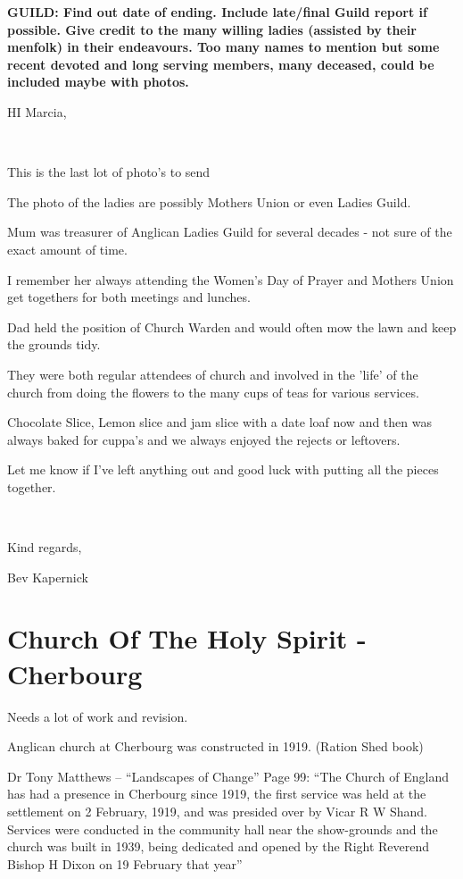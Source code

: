 \textbf{GUILD: Find out date of ending. Include late/final Guild report if possible. Give credit to the many willing ladies (assisted by their menfolk) in their endeavours. Too many names to mention but some recent devoted and long serving members, many deceased, could be included maybe with photos.}

HI Marcia,

~

This is the last lot of photo's to send

The photo of the ladies are possibly Mothers Union or even Ladies Guild.

Mum was treasurer of Anglican Ladies Guild for several decades - not sure of the exact amount of time.

I remember her always attending the Women's Day of Prayer and Mothers Union get togethers for both meetings and lunches.

Dad held the position of Church Warden and would often mow the lawn and keep the grounds tidy.

They were both regular attendees of church and involved in the 'life' of the church from doing the flowers to the many cups of teas for various services.

Chocolate Slice, Lemon slice and jam slice with a date loaf now and then was always baked for cuppa's and we always enjoyed the rejects or leftovers.

Let me know if I've left anything out and good luck with putting all the pieces together.

~

Kind regards,

Bev Kapernick

\hypertarget{church-of-the-holy-spirit---cherbourg}{%
\section{Church Of The Holy Spirit - Cherbourg}\label{church-of-the-holy-spirit---cherbourg}}

Needs a lot of work and revision.

Anglican church at Cherbourg was constructed in 1919. (Ration Shed book)

Dr Tony Matthews -- ``Landscapes of Change'' Page 99: ``The Church of England has had a presence in Cherbourg since 1919, the first service was held at the settlement on 2 February, 1919, and was presided over by Vicar R W Shand. Services were conducted in the community hall near the show-grounds and the church was built in 1939, being dedicated and opened by the Right Reverend Bishop H Dixon on 19 February that year''

